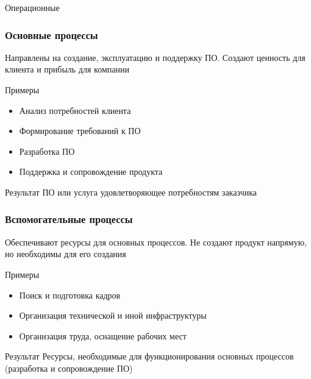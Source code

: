 \documentclass{../industrial-development}
\begin{document}
Операционные


\begin{frame} \frametitle{Основные процессы}
	\begin{block}{}
		Направлены на создание, эксплуатацию и поддержку ПО. Создают ценность для клиента и прибыль для компании
	\end{block}
	\begin{block}{Примеры}
		\begin{itemize}
			\item Анализ потребностей клиента
			\item Формирование требований к ПО
			\item Разработка ПО
			\item Поддержка и сопровождение продукта
		\end{itemize}
	\end{block}
	\begin{block}{Результат}
		ПО или услуга удовлетворяющее потребностям заказчика
	\end{block}
\end{frame}
\lecturenotes


\begin{frame} \frametitle{Вспомогательные процессы}
	\begin{block}{}
		Обеспечивают ресурсы для основных процессов. Не создают продукт напрямую, но необходимы для его создания
	\end{block}
	\begin{block}{Примеры}
		\begin{itemize}
			\item Поиск и подготовка кадров
			\item Организация технической и иной инфраструктуры
			\item Организация труда, оснащение рабочих мест
		\end{itemize}
	\end{block}
	\begin{block}{Результат}
		Ресурсы, необходимые для функционирования основных процессов (разработка и сопровождение ПО)
	\end{block}
\end{frame}
\lecturenotes
\end{document}

